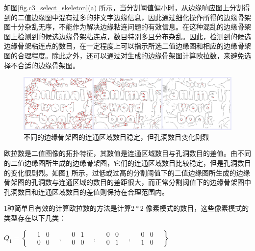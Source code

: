         如图\ref{fig.c3_select_skeleton}(a) 所示，当分割阈值偏小时，从边缘响应图上分割得到的二值边缘图中混有过多的非文字边缘信息，因此通过细化操作所得的边缘骨架图十分杂乱无序，不能作为解决边缘粘连问题的有效信息。在这种混乱的边缘骨架图上检测到的候选边缘骨架粘连点，数目特别多且分布杂乱。因此，检测到的候选边缘骨架粘连点的数目，在一定程度上可以指示所选二值边缘图和相应的边缘骨架图的合理程度。除此之外，还可以通过对生成的边缘骨架图计算欧拉数，来避免选择不合适的边缘骨架图。

        \begin{figure}[!h]
        \centering
        \includegraphics[width=\textwidth]{./figures/c3_compare_skeleton.jpg}
        \caption{不同的边缘骨架图的连通区域数目稳定，但孔洞数目变化剧烈}
        \label{fig.c3_compare_skeleton}
        \end{figure}

        欧拉数是二值图像的拓扑特征，其数值是连通区域数目与孔洞数目的差值。由不同的二值边缘图所生成的边缘骨架图，它们的连通区域数目比较稳定，但是孔洞数目的变化很剧烈。如图\ref{fig.c3_compare_skeleton} 所示，过低或过高的分割阈值下的二值边缘图所生成的边缘骨架图的孔洞数与连通区域的数目的差距很大，而正常分割阈值下的边缘骨架图中孔洞数目和连通区域数目的差值则保持在合理范围内。

        1种简单且有效的计算欧拉数的方法是计算$2*2$ 像素模式的数目，这些像素模式的类型存在以下几类：

        $Q_1 = \left\{
        \quad
        \begin{matrix} 1 & 0 \\ 0 & 0 \end{matrix}\quad,\quad
        \begin{matrix} 0 & 1 \\ 0 & 0 \end{matrix}\quad,\quad
        \begin{matrix} 0 & 0 \\ 0 & 1 \end{matrix}\quad,\quad
        \begin{matrix} 0 & 0 \\ 1 & 0 \end{matrix}
        \quad
        \right\}$

